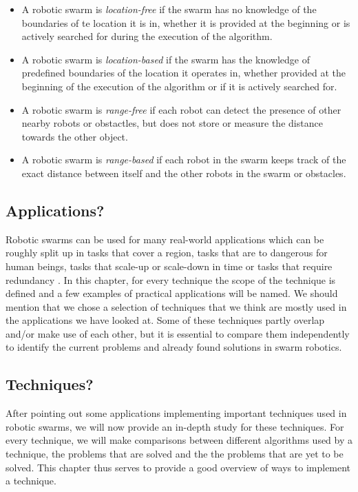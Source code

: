   \begin{itemize}
    \item A robotic swarm is \emph{location-free} if the swarm has no knowledge of the boundaries of te location it is in, whether it is provided at the beginning or is actively searched for during the execution of the algorithm. 
    \item A robotic swarm is \emph{location-based} if the swarm has the knowledge of predefined boundaries of the location it operates in, whether provided at the beginning of the execution of the algorithm or if it is actively searched for. 
    \item A robotic swarm is \emph{range-free} if each robot can detect the presence of other nearby robots or obstactles, but does not store or measure the distance towards the other object.
    \item A robotic swarm is \emph{range-based} if each robot in the swarm keeps track of the exact distance between itself and the other robots in the swarm or obstacles. 
  \end{itemize}

 \subsection{Applications?}
 Robotic swarms can be used for many real-world applications which can be roughly split up in tasks that cover a region, tasks that are to dangerous for human beings, tasks that scale-up or scale-down in time or tasks that require redundancy \cite{csahin2005swarm}. In this chapter, for every technique the scope of the technique is defined and a few examples of practical applications will be named. We should mention that we chose a selection of techniques that we think are mostly used in the applications we have looked at. Some of these techniques partly overlap and/or make use of each other, but it is essential to compare them independently to identify the current problems and already found solutions in swarm robotics.

 \subsection{Techniques?}
 
After pointing out some applications implementing important techniques used in robotic swarms, we will now provide an in-depth study for these techniques. For every technique, we will make comparisons between different algorithms used by a technique, the problems that are solved and the the problems that are yet to be solved. This chapter thus serves to provide a good overview of ways to implement a technique. 
